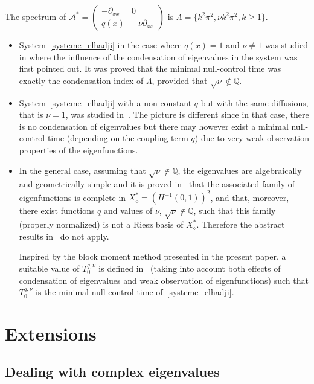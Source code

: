 \documentclass[11pt]{article}
\theoremstyle{definition}
\numberwithin{equation}{section}
\numberwithin{figure}{section}
\numberwithin{table}{section}
\newcommand\As{\mathcal{A}^*}
\newcommand{\Xalphas}{X_\diamond^*}
\begin{document}
The spectrum of $\As=
\begin{pmatrix} -\partial_{xx} & 0 \\ q(x) & -\nu \partial_{xx}
\end{pmatrix}$ is $\Lambda = \{ k^2 \pi^2 , \nu k^2 \pi^2, k\geq 1 \}$.
\begin{itemize}
\item System~\eqref{systeme_elhadji} in the case where $q(x)=1$ and $\nu\neq 1$ was studied in\linebreak \cite{AmmarKhodjaBenabdallahGonzalez-BurgosdeTeresa:2014} where the influence of the condensation of eigenvalues in the system was first pointed out. It was proved that the minimal null-control time was exactly the condensation index of $\Lambda$, provided that $\sqrt{\nu}\not\in \mathbb Q$.
\item System~\eqref{systeme_elhadji} with a non constant $q$ but with the same diffusions, that is $\nu=1$, was studied in~\cite{AKBGBdT_JMAA16}. The picture is different since in that case, there is no condensation of eigenvalues but there may however exist a minimal null-control time (depending on the coupling term $q$) due to very weak observation properties of the eigenfunctions.
\item In the general case, assuming that $\sqrt{\nu}\not\in \mathbb Q$, the eigenvalues are algebraically and geometrically simple and it is proved in~\cite{Samb18} that the associated family of eigenfunctions is complete in $\Xalphas=(H^{-1}(0,1))^2$, and that, moreover, there exist functions $q$ and values of $\nu$, $\sqrt{\nu}\not\in \mathbb Q$, such that this family (properly normalized) is not a Riesz basis of $\Xalphas$. Therefore the abstract results in~\cite{AmmarKhodjaBenabdallahGonzalez-BurgosdeTeresa:2014,AKBGBdT_JMAA16} do not apply.

Inspired by the block moment method presented in the present paper, a suitable value of $T_0^{q,\nu}$ is defined in~\cite{Samb18} (taking into account both effects of condensation of eigenvalues and weak observation of eigenfunctions) such that $T_0^{q,\nu}$ is the minimal null-control time of~\eqref{systeme_elhadji}.
\end{itemize}



\section{Extensions} \label{Sec:Extensions}


\subsection{Dealing with complex eigenvalues} \label{Subsec:ValeurPropresComplexes}
\end{document}
